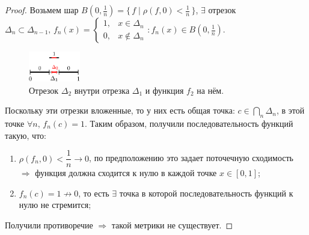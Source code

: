 \documentclass[12pt]{article}
\theoremstyle{definition}
\begin{document}
\begin{proof}
	Возьмем шар $B(0,\frac{1}{n}) = \{\, f \mid \rho(f,0) < \frac{1}{n} \,\}$, $\exists$ отрезок $\Delta_n \subset \Delta_{n-1},\, f_n(x) = \begin{cases} 1, & x \in \Delta_n\\0, & x \notin \Delta_n\end{cases} \colon f_n(x) \in B(0,\frac{1}{n})$.
	\begin{figure}[H]
		\centering
		\includegraphics[width=0.2\textwidth]{6_3.eps}
		\caption{Отрезок $\Delta_2$ внутри отрезка $\Delta_1$ и функция $f_2$ на нём.}
		\label{6_3}
	\end{figure}
	Поскольку эти отрезки вложенные, то у них есть общая точка: $c \in \bigcap\limits_n \Delta_n$, в этой точке $\forall n, \, f_n(c) = 1$. Таким образом, получили последовательность функций такую, что:
	\begin{enumerate}[label ={(\arabic*)}]
		\item $\rho(f_n,0) < \dfrac{1}{n} \to 0$, по предположению это задает поточечную сходимость $\Rightarrow$ функция должна сходится к нулю в каждой точке $x \in [0,1]$;
		\item $f_n(c) = 1 \nrightarrow 0$, то есть $\exists$ точка в которой последовательность функций к нулю не стремится;
	\end{enumerate}
	Получили противоречие $\Rightarrow$ такой метрики не существует.
\end{proof}
\end{document}
